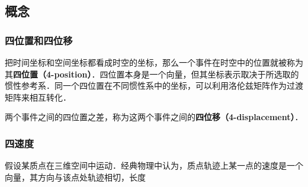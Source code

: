 

\subsection{概念}
\subsubsection{四位置和四位移}
把时间坐标和空间坐标都看成时空的坐标，那么一个事件在时空中的位置就被称为其\textbf{四位置（4-position）}．四位置本身是一个向量，但其坐标表示取决于所选取的惯性参考系．同一个四位置在不同惯性系中的坐标，可以利用洛伦兹矩阵作为过渡矩阵来相互转化．

两个事件之间的四位置之差，称为这两个事件之间的\textbf{四位移（4-displacement）}．

\subsubsection{四速度}

假设某质点在三维空间中运动．经典物理中认为，质点轨迹上某一点的速度是一个向量，其方向与该点处轨迹相切，长度
